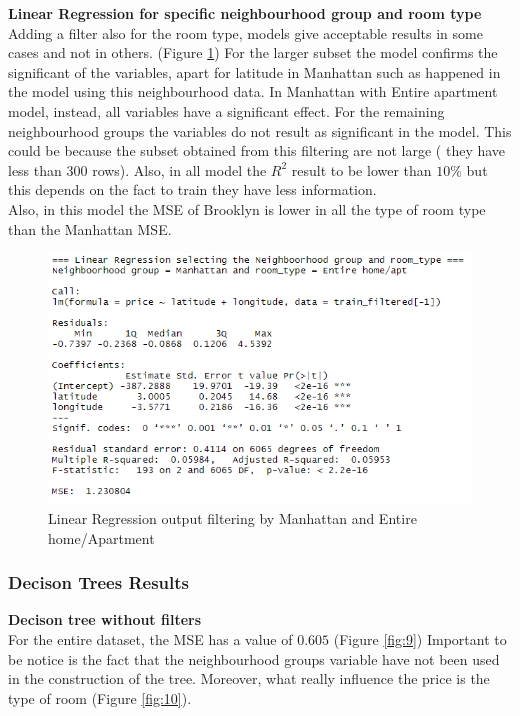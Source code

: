 \documentclass{FR16}
\begin{document}
\newpage
\noindent \textbf{Linear Regression for specific neighbourhood group and room type}\\
\noindent Adding a filter also for the room type, models give acceptable results in some cases and not in others. (Figure \ref{fig:7}) 
For the larger subset the model confirms the significant of the variables, apart for latitude in Manhattan such as happened in the model using this neighbourhood data. In Manhattan with Entire apartment model, instead, all variables have a significant effect. For the remaining neighbourhood groups the variables do not result as significant in the model. This could be because the subset obtained from this filtering are not large ( they have less than 300 rows). Also, in all model the $R^2$ result to be lower than $10\%$ but this depends on the fact to train they have less information.
\\
Also, in this model the MSE of Brooklyn is lower in all the type of room type than the Manhattan MSE. 
\begin{figure}[H]
\centering
\includegraphics[width=1\textwidth]{figures/lm3.PNG} 
\caption{\label{fig:7}  Linear Regression output filtering by  Manhattan and Entire home/Apartment }
\end{figure}




\newpage 
\subsubsection{Decison Trees Results}
\textbf{Decison tree  without filters}\\
\noindent For the entire dataset, the MSE has a value of $0.605$ (Figure \ref{fig:9}) Important to be notice is the fact that the neighbourhood groups variable have not been used in the construction of the tree. Moreover, what really influence the price is the type of room (Figure \ref{fig:10}).
\end{document}
